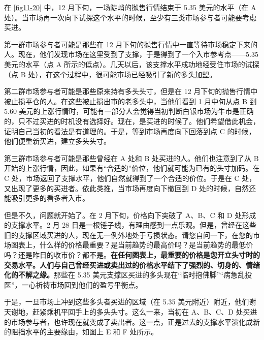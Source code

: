 

在 \autoref{fig11-20} 中，12 月下旬，一场陡峭的抛售行情结束于 5.35 美元的水平（在 A 处）。当市场再一次向下试探这个水平的时候，至少有三类市场参与者可能要考虑买进。

第一群市场参与者可能是那些在 12 月下旬的抛售行情中一直等待市场稳定下来的人。现在，他们发现市场在这里受到了支撑，于是得到了一个入市参考点——5.35 美元的水平（点 A 所示的低点）。几天以后，该支撑水平成功地经受住市场的试探（点 B 处），在这个过程中，很可能市场已经吸引了新的多头加盟。

第二群市场参与者可能是那些原来持有多头头寸，但是在 12 月下旬的抛售行情中被止损平仓的人。在这些被止损出市的老多头中，当他们看到 1 月中旬从点 B 到 5.60 美元的上涨行情时，可能有一部分人会觉得当初判断白银市场为牛市是正确的，只不过买进的时机没有选择好。现在，是买进的时候了。他们希望借此机会，证明自己当初的看法是有道理的。于是，等到市场再度向下回落到点 C 的时候，他们便重新买进，建立多头头寸。

第三群市场参与者可能是那些曾经在 A 处和 B 处买进的人。他们也注意到了从 B 开始的上涨行情，因此，如果有“合适的”价位，他们就可能为已有的头寸加码。在 C 处，市场返回了支撑水平，他们自然就得到了一个合适的价位。于是在 C 处，又出现了更多的买进者。依此类推，当市场再度向下撤回到 D 处的时候，自然还能吸引更多的看多者入市。

但是不久，问题就开始了。在 2 月下旬，价格向下突破了 A、B、C 和 D 处形成的支撑水平。2 月 28 日是一根锤子线，有理由感到一点乐观。但是，曾经在这些旧的支撑区域买进的人，现在无一例外地处于亏损状态。请您自问一下，在您的市场图表上，什么样的价格最重要？是当前趋势的最高价吗？是当前趋势的最低价吗？还是昨日的收市价？都不是。\textbf{在任何图表上，最重要的价格是您开立头寸时的交易水平。人们与自己曾经买进或卖出过的价格水平结下了强烈的、切身的、情绪化的不解之缘。}那些在 5.35 美元支撑区买进的多头现在“临时抱佛脚”“病急乱投医”，一心祈祷市场回到他们的盈亏平衡点。

于是，一旦市场上冲到这些多头者买进的区域（在 5.35 美元附近）附近，他们谢天谢地，赶紧乘机平回手上的多头头寸。这么一来，当初在 A、B、C、D 处买进的市场参与者，也许现在就变成了卖出者。这一点，正是过去的支撑水平演化成新的阻挡水平的主要缘由，如图上 E 和 F 处所示。

